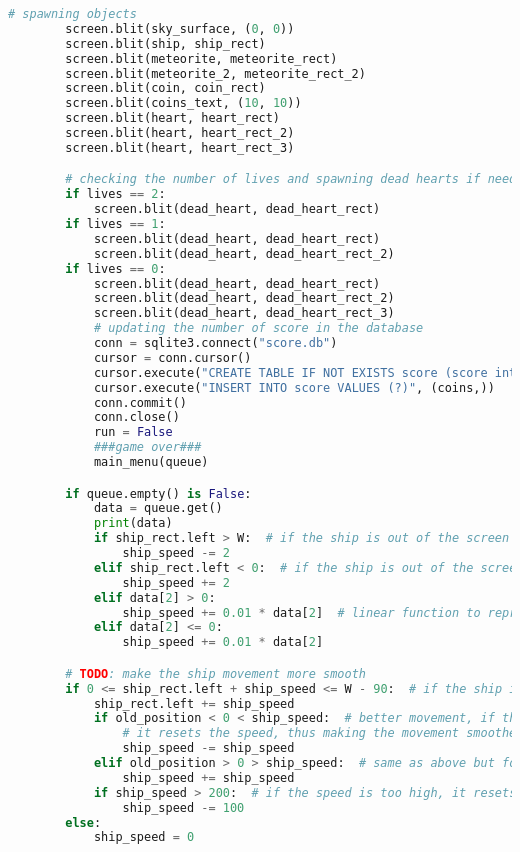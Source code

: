 \documentclass[12pt]{report}			%
\begin{document}
\begin{appendices}
\begin{lstlisting}[title={Program hra.py}, caption={hra.py},  label={lst:hra}, language=Python]
        # spawning objects
        screen.blit(sky_surface, (0, 0))
        screen.blit(ship, ship_rect)
        screen.blit(meteorite, meteorite_rect)
        screen.blit(meteorite_2, meteorite_rect_2)
        screen.blit(coin, coin_rect)
        screen.blit(coins_text, (10, 10))
        screen.blit(heart, heart_rect)
        screen.blit(heart, heart_rect_2)
        screen.blit(heart, heart_rect_3)

        # checking the number of lives and spawning dead hearts if needed
        if lives == 2:
            screen.blit(dead_heart, dead_heart_rect)
        if lives == 1:
            screen.blit(dead_heart, dead_heart_rect)
            screen.blit(dead_heart, dead_heart_rect_2)
        if lives == 0:
            screen.blit(dead_heart, dead_heart_rect)
            screen.blit(dead_heart, dead_heart_rect_2)
            screen.blit(dead_heart, dead_heart_rect_3)
            # updating the number of score in the database
            conn = sqlite3.connect("score.db")
            cursor = conn.cursor()
            cursor.execute("CREATE TABLE IF NOT EXISTS score (score integer)")
            cursor.execute("INSERT INTO score VALUES (?)", (coins,))
            conn.commit()
            conn.close()
            run = False
            ###game over###
            main_menu(queue)

        if queue.empty() is False:
            data = queue.get()
            print(data)
            if ship_rect.left > W:  # if the ship is out of the screen
                ship_speed -= 2
            elif ship_rect.left < 0:  # if the ship is out of the screen
                ship_speed += 2
            elif data[2] > 0:
                ship_speed += 0.01 * data[2]  # linear function to represent the speed of the ship
            elif data[2] <= 0:
                ship_speed += 0.01 * data[2]

        # TODO: make the ship movement more smooth
        if 0 <= ship_rect.left + ship_speed <= W - 90:  # if the ship is in the screen
            ship_rect.left += ship_speed
            if old_position < 0 < ship_speed:  # better movement, if the ship is moving to the right
                # it resets the speed, thus making the movement smoother
                ship_speed -= ship_speed
            elif old_position > 0 > ship_speed:  # same as above but for the left
                ship_speed += ship_speed
            if ship_speed > 200:  # if the speed is too high, it resets it
                ship_speed -= 100
        else:
            ship_speed = 0


\end{lstlisting}
\end{appendices}
\end{document}
